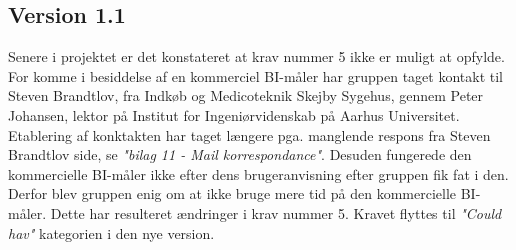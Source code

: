 %
%
%
%
%

\subsection{Version 1.1}

Senere i projektet er det konstateret at krav nummer 5 ikke er muligt at opfylde. For komme i besiddelse af en kommerciel BI-måler har gruppen taget kontakt til Steven Brandtlov, fra Indkøb og Medicoteknik Skejby Sygehus, gennem  Peter Johansen, lektor på Institut for Ingeniørvidenskab på Aarhus Universitet. Etablering af konktakten har taget længere pga. manglende respons fra Steven Brandtlov side, se \textit{"bilag 11 - Mail korrespondance"}. Desuden fungerede den kommercielle BI-måler ikke efter dens brugeranvisning efter gruppen fik fat i den. Derfor  blev gruppen enig om at ikke bruge mere tid på den kommercielle BI-måler. Dette har resulteret ændringer i krav nummer 5. Kravet flyttes til \textit{"Could hav"} kategorien i den nye version.  

